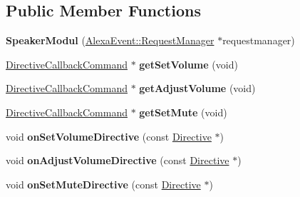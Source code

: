 \subsection*{Public Member Functions}
\begin{DoxyCompactItemize}
\item 
\mbox{\label{classdirective_1_1SpeakerModul_aa7f2f3c6821a5090cf82adecda7aadab}} 
{\bfseries Speaker\+Modul} (\hyperlink{classAlexaEvent_1_1RequestManager}{Alexa\+Event\+::\+Request\+Manager} $\ast$requestmanager)
\item 
\mbox{\label{classdirective_1_1SpeakerModul_a3127d461ae5ad9dafc750172016221c4}} 
\hyperlink{classdirective_1_1DirectiveCallbackCommand}{Directive\+Callback\+Command} $\ast$ {\bfseries get\+Set\+Volume} (void)
\item 
\mbox{\label{classdirective_1_1SpeakerModul_a156dc9524cbc419c3707471ea2b64b3b}} 
\hyperlink{classdirective_1_1DirectiveCallbackCommand}{Directive\+Callback\+Command} $\ast$ {\bfseries get\+Adjust\+Volume} (void)
\item 
\mbox{\label{classdirective_1_1SpeakerModul_a3efdb8362682f0c15f6b48f1de59db1e}} 
\hyperlink{classdirective_1_1DirectiveCallbackCommand}{Directive\+Callback\+Command} $\ast$ {\bfseries get\+Set\+Mute} (void)
\item 
\mbox{\label{classdirective_1_1SpeakerModul_aa2ec002c587646e204a84a73122afe7c}} 
void {\bfseries on\+Set\+Volume\+Directive} (const \hyperlink{classdirective_1_1Directive}{Directive} $\ast$)
\item 
\mbox{\label{classdirective_1_1SpeakerModul_a4acee4bcfe5b9f4eb073b2ea13a95944}} 
void {\bfseries on\+Adjust\+Volume\+Directive} (const \hyperlink{classdirective_1_1Directive}{Directive} $\ast$)
\item 
\mbox{\label{classdirective_1_1SpeakerModul_a01216118b1d48fb4b9fcc052a9ecf562}} 
void {\bfseries on\+Set\+Mute\+Directive} (const \hyperlink{classdirective_1_1Directive}{Directive} $\ast$)
\end{DoxyCompactItemize}

